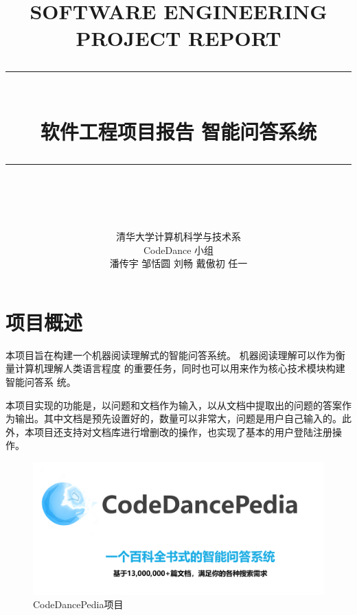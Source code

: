 \documentclass[12pt]{article}
\newcommand{\HRule}[1]{\rule{\linewidth}{#1}}
\begin{document}
\title{ \normalsize \textsc{SOFTWARE ENGINEERING PROJECT REPORT}
		\\ [2.0cm]
		\HRule{0.5pt} \\
		\LARGE \textbf{\uppercase{软件工程项目报告 \quad 智能问答系统}}
		\HRule{2pt} \\ [0.5cm]
		\normalsize  \vspace*{5\baselineskip}}

\author{
        清华大学\quad 计算机科学与技术系\\ 
        CodeDance 小组 \\
        潘传宇 \quad 邹恬圆 \quad 刘畅 \quad 戴傲初 \quad 任一 \\}

\maketitle

\newpage
\section{项目概述}  %
本项目旨在构建一个机器阅读理解式的智能问答系统。
机器阅读理解可以作为衡量计算机理解人类语言程度
的重要任务，同时也可以用来作为核心技术模块构建智能问答系
统。

本项目实现的功能是，以问题和文档作为输入，以从文档中提取出的问题的答案作为输出。其中文档是预先设置好的，数量可以非常大，问题是用户自己输入的。此外，本项目还支持对文档库进行增删改的操作，也实现了基本的用户登陆注册操作。

\begin{figure}[htbp]  %
    \centering  %
    \includegraphics[width=\textwidth]{fig/CodeDance.png}  %
    \caption{CodeDancePedia项目}  %
    \label{fig:codedance}  %
\end{figure}
    
\end{document}
